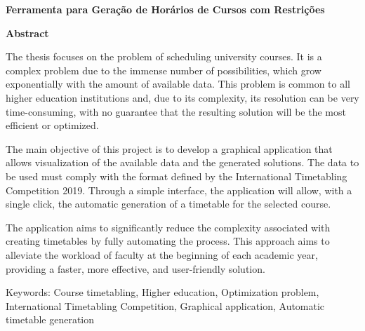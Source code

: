 {\centering\bfseries\fontsize{17}{24}\selectfont Ferramenta para Geração de Horários de Cursos com Restrições \par}
\vspace{.5cm}

{\centering\bfseries\fontsize{17}{24}\selectfont Abstract \par}
\vspace{1cm}

The thesis focuses on the problem of scheduling university courses. It is a complex problem due to the immense number of possibilities, which grow exponentially with the amount of available data. This problem is common to all higher education institutions and, due to its complexity, its resolution can be very time-consuming, with no guarantee that the resulting solution will be the most efficient or optimized.

The main objective of this project is to develop a graphical application that allows visualization of the available data and the generated solutions. The data to be used must comply with the format defined by the International Timetabling Competition 2019. Through a simple interface, the application will allow, with a single click, the automatic generation of a timetable for the selected course.

The application aims to significantly reduce the complexity associated with creating timetables by fully automating the process. This approach aims to alleviate the workload of faculty at the beginning of each academic year, providing a faster, more effective, and user-friendly solution.

\vfill

Keywords: Course timetabling, Higher education, Optimization problem, International Timetabling Competition, Graphical application, Automatic timetable generation